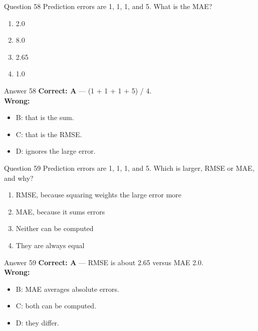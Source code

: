 \documentclass[aspectratio=169,11pt]{beamer}
\begin{document}
\begin{frame}{Question 58}
Prediction errors are 1, 1, 1, and 5. What is the MAE?
\begin{enumerate}[label=\Alph*.]
\item 2.0
\item 8.0
\item 2.65
\item 1.0
\end{enumerate}
\end{frame}
\begin{frame}{Answer 58}
\textbf{Correct: A} --- (1 + 1 + 1 + 5) / 4.\\
\vspace{0.5em}
\textbf{Wrong:}
\begin{itemize}
\item B: that is the sum.
\item C: that is the RMSE.
\item D: ignores the large error.
\end{itemize}
\end{frame}

\begin{frame}{Question 59}
Prediction errors are 1, 1, 1, and 5. Which is larger, RMSE or MAE, and why?
\begin{enumerate}[label=\Alph*.]
\item RMSE, because squaring weights the large error more
\item MAE, because it sums errors
\item Neither can be computed
\item They are always equal
\end{enumerate}
\end{frame}
\begin{frame}{Answer 59}
\textbf{Correct: A} --- RMSE is about 2.65 versus MAE 2.0.\\
\vspace{0.5em}
\textbf{Wrong:}
\begin{itemize}
\item B: MAE averages absolute errors.
\item C: both can be computed.
\item D: they differ.
\end{itemize}
\end{frame}
\end{document}
